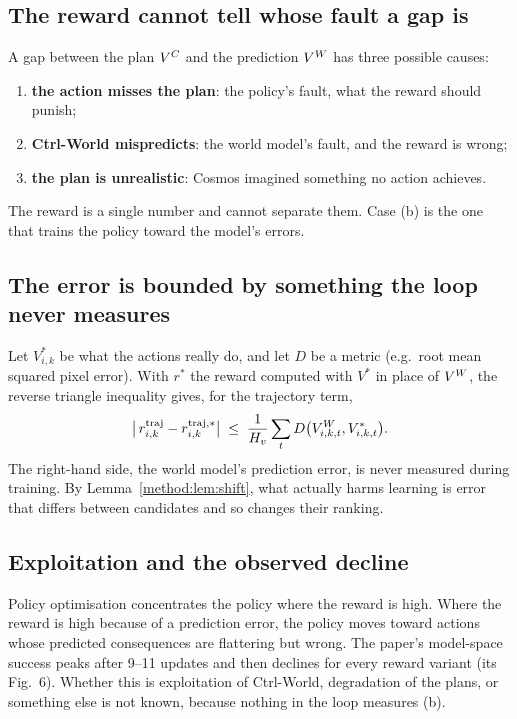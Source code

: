 \subsection{The reward cannot tell whose fault a gap is}
A gap between the plan $V^{C}$ and the prediction $V^{W}$ has three possible causes:
\begin{enumerate}[label=(\alph*)]
\item \textbf{the action misses the plan}: the policy's fault, what the reward should punish;
\item \textbf{Ctrl-World mispredicts}: the world model's fault, and the reward is wrong;
\item \textbf{the plan is unrealistic}: Cosmos imagined something no action achieves.
\end{enumerate}
The reward is a single number and cannot separate them. Case (b) is the one that trains the policy toward the model's errors.

\subsection{The error is bounded by something the loop never measures}
Let $V^\ast_{i,k}$ be what the actions really do, and let $D$ be a metric (e.g.\ root mean squared pixel error). With $r^{\ast}$ the reward computed with $V^\ast$ in place of $V^{W}$, the reverse triangle inequality gives, for the trajectory term,
\begin{equation}\label{method:eq:bound}
\big|\,r^{\mathrm{traj}}_{i,k}-r^{\mathrm{traj},\ast}_{i,k}\big|\;\le\;\frac{1}{H_v}\sum_{t}D\big(V^{W}_{i,k,t},V^\ast_{i,k,t}\big).
\end{equation}
The right-hand side, the world model's prediction error, is never measured during training. By Lemma~\ref{method:lem:shift}, what actually harms learning is error that differs between candidates and so changes their ranking.

\subsection{Exploitation and the observed decline}
Policy optimisation concentrates the policy where the reward is high. Where the reward is high because of a prediction error, the policy moves toward actions whose predicted consequences are flattering but wrong. The paper's model-space success peaks after 9--11 updates and then declines for every reward variant (its Fig.~6). Whether this is exploitation of Ctrl-World, degradation of the plans, or something else is not known, because nothing in the loop measures (b).

